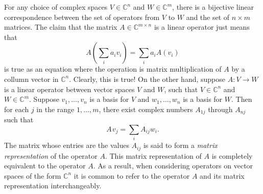 For any choice of complex spaces $V \in \mathbb{C}^n $ and $W \in \mathbb{C}^m$, there is a bijective linear correspondence between the set of operators from $V$ to $W$ and the set of $n \times m$ matrices. %
The claim that the matrix $A \in \mathbb{C}^{m\times n}$ is a linear operator just means that
\begin{equation*}
  A \left( \sum_{i} a_{i} v_{i} \right) = \sum_{i} a_i A (v_{i})
\end{equation*}
is true as an equation where the operation is matrix multiplication of $A$ by a collumn vector in $\mathbb{C}^n$. Clearly, this is true! On the other hand, suppose $A : V \rightarrow W$ is a linear operator between vector spaces $V$ and $W$, such that $V \in \mathbb{C}^n $ and $W \in \mathbb{C}^m$. Suppose $v_1,\ldots, v_n$ is a basis for $V$ and $w_1,\ldots,w_n $ is a
basis for $W$. Then for each $j$ in the range $1, \ldots ,m$, there exist complex numbers $A_{1j}$ through $A_{nj}$ such that
\begin{equation*}
  A \hspace{1pt} v_j = \sum_{i} A_{ij} w_i.
\end{equation*}
The matrix whose entries are the values $A_{ij}$ is said to form a \emph{matrix representation} of the operator $A$. This matrix representation of $A$ is completely equivalent to the operator $A$. As a result, when considering operators on vector spaces of the form $\mathbb{C}^n$ it is common to refer to the operator $A$ and its matrix representation interchangeably.

